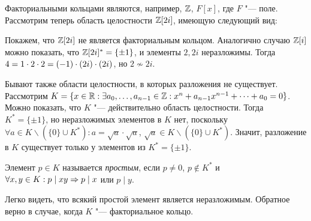 \begin{example}
	Факториальными кольцами являются, например, $\mathbb{Z}$, $F[x]$, где $F$ "--- поле. Рассмотрим теперь область целостности $\mathbb{Z}[2i]$, имеющую следующий вид:
	\begin{center}
	\end{center}
	
	Покажем, что $\mathbb{Z}[2i]$ не является факториальным кольцом. Аналогично случаю $\mathbb{Z}[i]$ можно показать, что $\mathbb{Z}[2i]^* = \{\pm1\}$, и элементы $2, 2i$ неразложимы. Тогда $4 = 1 \cdot 2 \cdot 2 \hm= (-1)\cdot (2i) \cdot (2i)$, но $2 \not\sim 2i$.
\end{example}

\begin{note}
	Бывают также области целостности, в которых разложения не существует. Рассмотрим $K = \{x \in \mathbb{R}: \exists a_0, \dotsc, a_{n - 1} \in \mathbb{Z}: x^n + a_{n-1}x^{n-1} + \dotsb + a_0 = 0\}$. Можно показать, что $K$ "--- действительно область целостности. Тогда $K^* = \{\pm1\}$, но неразложимых элементов в $K$ нет, поскольку $\forall a \in K \backslash (\{0\} \cup K^*): a = \sqrt{a} \cdot \sqrt{a}$, $\sqrt{a} \in K \backslash (\{0\} \cup K^*)$. Значит, разложение в $K$ существует только у элементов из $K^* = \{\pm1\}$.
\end{note}

\begin{definition}
	Элемент $p \in K$ называется \textit{простым}, если $p \ne 0$, $p \not\in K^*$ и $\forall x, y \in K: p \mid xy \Rightarrow p \mid x$ или $p \mid y$.
\end{definition}

\begin{note}
	Легко видеть, что всякий простой элемент является неразложимым. Обратное верно в случае, когда $K$ "--- факториальное кольцо.
\end{note}

